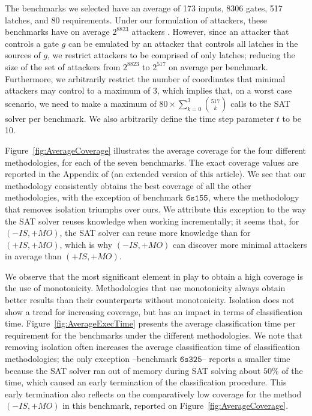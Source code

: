 {{The benchmarks we selected have an average of 173 inputs, 8306 gates, 517 latches, and 80 requirements. } Under our formulation of attackers, these benchmarks have on average $2^{8823}$ attackers%
. However, since an attacker that controls a gate $g$ can be emulated by an attacker that controls all latches in the sources of $g$, we restrict attackers to be comprised of only latches; reducing the size of the set of attackers from $2^{8823}$ to $2^{517}$ on average per benchmark. Furthermore, we arbitrarily restrict the number of coordinates that minimal attackers may control to a maximum of 3, which implies that, on a worst case scenario, we need to make a maximum of $80\times\sum_{k=0}^3 \binom {517}k$ calls to the SAT solver per benchmark. We also arbitrarily define the time step parameter $t$ to be 10.

Figure~\ref{fig:AverageCoverage} illustrates the average coverage for the four different methodologies, for each of the seven benchmarks. The exact coverage values are reported in the Appendix of \cite{aig-ac-arxiv} (an extended version of this article). We see that our methodology consistently obtains the best coverage of all the other methodologies, with the exception of benchmark $\mathtt{6s155}$, where the methodology that removes isolation triumphs over ours. We attribute this exception to the way the SAT solver reuses knowledge when working incrementally; it seems that, for $(-IS,+MO)$, the SAT solver can reuse more knowledge than for $(+IS,+MO)$, which is why $(-IS,+MO)$ can discover more minimal attackers in average than $(+IS,+MO)$. 


We observe that the most significant element in play to obtain a high coverage is the use of monotonicity. Methodologies that use monotonicity always obtain better results than their counterparts without monotonicity. Isolation does not show a trend for increasing coverage, but has an impact in terms of classification time. Figure~\ref{fig:AverageExecTime} presents the average classification time per requirement for the benchmarks under the different methodologies. We note that removing isolation often increases the average classification time of classification methodologies; the only exception --benchmark $\mathtt{6s325}$-- reports a smaller time because the SAT solver ran out of memory during SAT solving about $50\%$ of the time, which caused an early termination of the classification procedure. This early termination also reflects on the comparatively low coverage for the method $(-IS,+MO)$ in this benchmark, reported on Figure~\ref{fig:AverageCoverage}.

}
